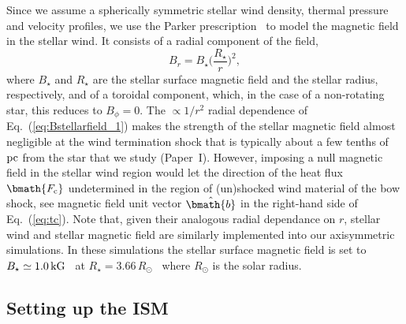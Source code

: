 \documentclass[useAMS,usenatbib]{mn2e}
\begin{document}
Since we assume a spherically symmetric stellar wind density, thermal pressure and 
velocity profiles, we use the Parker prescription~\citep{parker_paj_128_1958} to model 
the magnetic field in the stellar wind. It consists of a radial component of the field, 
%
\begin{equation}
	B_{r} = B_{\star} \Big( \frac{R_{\star}}{r} \Big)^{2},
\label{eq:Bstellarfield_1}
\end{equation}
%
where $B_{\star}$ and $R_{\star}$ are the stellar surface magnetic field and the stellar radius, 
respectively, and of a toroidal component, which, in the case of a non-rotating star, this 
reduces to $B_{\phi} = 0$. The $\propto 1/r^{2}$ radial dependence of
Eq.~(\ref{eq:Bstellarfield_1}) makes the strength
of the stellar magnetic field almost negligible at the wind termination shock
that is typically about a few tenths of $\rm pc$ from the star that we study 
(Paper~I). However, imposing a null
magnetic field in the stellar wind region would let the direction of the heat
flux $\bmath{{F}_{\rm c}}$ undetermined in the region of (un)shocked wind 
material of the bow shock, see magnetic field unit vector $\hat{\bmath{b}}$ 
in the right-hand side of Eq.~(\ref{eq:tc}). Note that, given their analogous radial 
dependance on $r$, stellar wind and stellar magnetic field are 
similarly implemented into our axisymmetric simulations. 
In these simulations the stellar surface magnetic 
field is set to $B_{\star} \simeq 1.0\,\rm kG$~\citep{donati_mnras_333_2002} 
at $R_{\star}=3.66\, R_{\odot}$~\citep{brott_aa_530_2011a} where $R_{\odot}$ 
is the solar radius. 


\subsection{Setting up the ISM}
\label{sect:medium}
\end{document}
